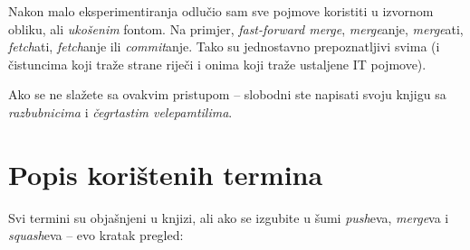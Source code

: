 Nakon malo eksperimentiranja odlučio sam sve pojmove koristiti u izvornom obliku, ali \emph{ukošenim} fontom.
Na primjer, \emph{fast-forward merge}, \emph{merge}anje, \emph{merge}ati, \emph{fetch}ati, \emph{fetch}anje ili \emph{commit}anje.
Tako su jednostavno prepoznatljivi svima (i čistuncima koji traže strane riječi i onima koji traže ustaljene IT pojmove).

Ako se ne slažete sa ovakvim pristupom -- slobodni ste napisati svoju knjigu sa \emph{razbubnicima} i \emph{čegrtastim velepamtilima}.

\section*{Popis korištenih termina}

Svi termini su objašnjeni u knjizi, ali ako se izgubite u šumi \emph{push}eva, \emph{merge}va i \emph{squash}eva -- evo kratak pregled:

